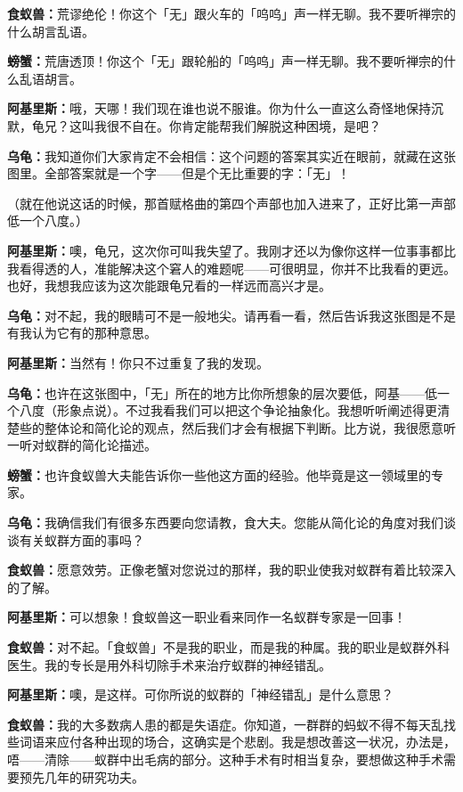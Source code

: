 \documentclass[
  12pt,
  twoside,
  openright,
  oldfontcommands,
]{memoir}
\newcommand{\dialogname}[1]{{\heifamily\bfseries #1}}
\begin{document}
\dialogname{食蚁兽：}荒谬绝伦！你这个「无」跟火车的「呜呜」声一样无聊。我不要听禅宗的什么胡言乱语。

\dialogname{螃蟹：}荒唐透顶！你这个「无」跟轮船的「呜呜」声一样无聊。我不要听禅宗的什么乱语胡言。

\dialogname{阿基里斯：}哦，天哪！我们现在谁也说不服谁。你为什么一直这么奇怪地保持沉默，龟兄？这叫我很不自在。你肯定能帮我们解脱这种困境，是吧？

\dialogname{乌龟：}我知道你们大家肯定不会相信：这个问题的答案其实近在眼前，就藏在这张图里。全部答案就是一个字------但是个无比重要的字：「无」！

（就在他说这话的时候，那首赋格曲的第四个声部也加入进来了，正好比第一声部低一个八度。）

\dialogname{阿基里斯：}噢，龟兄，这次你可叫我失望了。我刚才还以为像你这样一位事事都比我看得透的人，准能解决这个窘人的难题呢------可很明显，你并不比我看的更远。也好，我想我应该为这次能跟龟兄看的一样远而高兴才是。

\dialogname{乌龟：}对不起，我的眼睛可不是一般地尖。请再看一看，然后告诉我这张图是不是有我认为它有的那种意思。

\dialogname{阿基里斯：}当然有！你只不过重复了我的发现。

\dialogname{乌龟：}也许在这张图中，「无」所在的地方比你所想象的层次要低，阿基------低一个八度（形象点说）。不过我看我们可以把这个争论抽象化。我想听听阐述得更清楚些的整体论和简化论的观点，然后我们才会有根据下判断。比方说，我很愿意听一听对蚁群的简化论描述。

\dialogname{螃蟹：}也许食蚁兽大夫能告诉你一些他这方面的经验。他毕竟是这一领域里的专家。

\dialogname{乌龟：}我确信我们有很多东西要向您请教，食大夫。您能从简化论的角度对我们谈谈有关蚁群方面的事吗？

\dialogname{食蚁兽：}愿意效劳。正像老蟹对您说过的那样，我的职业使我对蚁群有着比较深入的了解。

\dialogname{阿基里斯：}可以想象！食蚁兽这一职业看来同作一名蚁群专家是一回事！

\dialogname{食蚁兽：}对不起。「食蚁兽」不是我的职业，而是我的种属。我的职业是蚁群外科医生。我的专长是用外科切除手术来治疗蚁群的神经错乱。

\dialogname{阿基里斯：}噢，是这样。可你所说的蚁群的「神经错乱」是什么意思？

\dialogname{食蚁兽：}我的大多数病人患的都是失语症。你知道，一群群的蚂蚁不得不每天乱找些词语来应付各种出现的场合，这确实是个悲剧。我是想改善这一状况，办法是，唔------清除------蚁群中出毛病的部分。这种手术有时相当复杂，要想做这种手术需要预先几年的研究功夫。
\end{document}

